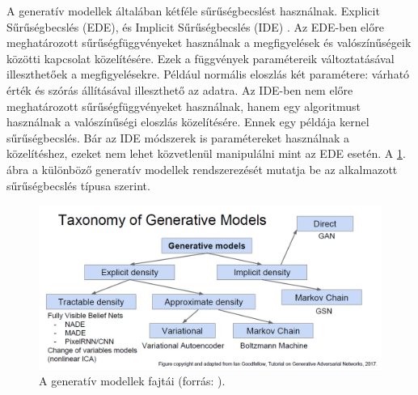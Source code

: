 A generatív modellek általában kétféle sűrűségbecslést használnak. Explicit Sűrűségbecslés (EDE), és Implicit Sűrűségbecslés (IDE) \cite{goodfellow2016nips}. Az EDE-ben előre meghatározott sűrűségfüggvényeket használnak a megfigyelések és valószínűségeik közötti kapcsolat közelítésére. Ezek a függvények paramétereik változtatásával illeszthetőek a megfigyelésekre. Például normális eloszlás két paramétere: várható érték és szórás állításával illeszthető az adatra. Az IDE-ben nem előre meghatározott sűrűségfüggvényeket használnak, hanem egy algoritmust használnak a valószínűségi eloszlás közelítésére. Ennek egy példája kernel sűrűségbecslés. Bár az IDE módszerek is paramétereket használnak a közelítéshez, ezeket nem lehet közvetlenül manipulálni mint az EDE esetén. A \ref{fig:gen_models_tax}. ábra a különböző generatív modellek rendszerezését mutatja be az alkalmazott sűrűségbecslés típusa szerint.



\begin{figure}[ht]
	\centering
	\includegraphics[width=1\columnwidth]{figures/generative_model_taxonomy.png}
	\caption{A generatív modellek fajtái (forrás: \cite{goodfellow2016nips}).}
	\label{fig:gen_models_tax}
\end{figure}


